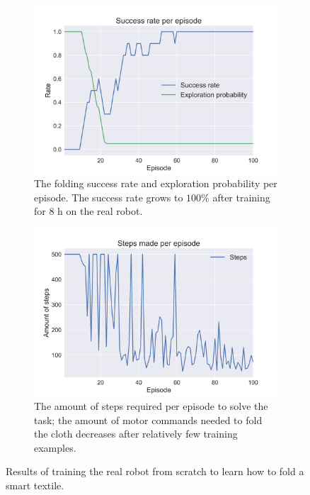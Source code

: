 \documentclass[\home/main.tex]{subfiles}
\begin{document}
\begin{figure}[htpb]{}
    \centering
    \begin{subfigure}[b][]{0.9\textwidth}
        \centering
        \includegraphics[width=\linewidth]{figures/avg-success-rate.jpg}
        \caption{The folding success rate and exploration probability per episode. The success rate grows to $100\%$ after training for $8$ h on the real robot.}
        \label{fig:instrumentation_results_success_rate}
    \end{subfigure}

    \begin{subfigure}[b][]{0.9\textwidth}
        \centering
        \includegraphics[width=\linewidth]{figures/steps.jpg}
        \caption{The amount of steps required per episode to solve the task; the amount of motor commands needed to fold the cloth decreases after relatively few training examples.}
        \label{fig:instrumentation_results_steps}
    \end{subfigure}

    \caption{Results of training the real robot from scratch to learn how to fold a smart textile.}
    \label{fig:instrumentation_results}
\end{figure}
\end{document}

